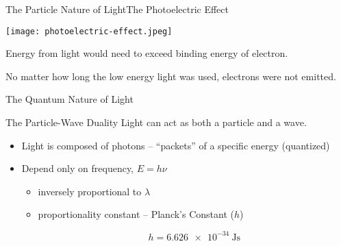 \documentclass[notes=hide]{beamer}
\begin{document}
\begin{frame}{The Particle Nature of Light}{The Photoelectric Effect}
	\begin{center}
		\texttt{[image: photoelectric-effect.jpeg]}
	\end{center}

	\begin{description}[<+->]
		\item[Theory:] Energy from light would need to exceed binding
			energy of electron.
		\item[Observation:] No matter how long the low energy light was
			used, electrons were not emitted.
	\end{description}
\end{frame}

\begin{frame}{The Quantum Nature of Light}
	\begin{block}{The Particle-Wave Duality}
		Light can act as both a particle and a wave.
	\end{block}

	\begin{itemize}
		\item Light is composed of photons -- ``packets'' of a specific
			energy (\alert{quantized})
		\item Depend only on frequency, $E = h \nu$
			\begin{itemize}
				\item inversely proportional to $\lambda$
				\item proportionality constant -- \alert{Planck's
					Constant ($h$)}

					\begin{equation*}
						h =
						\SI{6.626e-34}{\joule\second}
					\end{equation*}
			\end{itemize}
	\end{itemize}
\end{frame}

\end{document}
